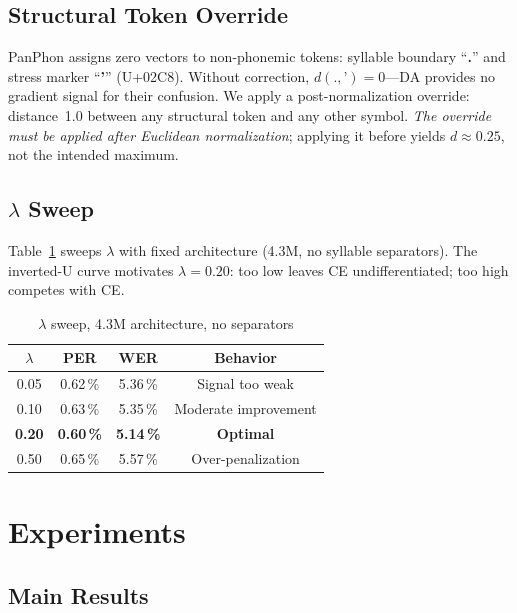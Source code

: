 \documentclass[conference]{IEEEtran}
\newcommand{\lam}{\lambda}                %
\begin{document}
\subsection{Structural Token Override}

PanPhon assigns zero vectors to non-phonemic tokens: syllable
boundary ``\textbf{.}'' and stress marker ``\textbf{'}'' (U+02C8).
Without correction, $d(., \text{'}) = 0$---DA provides no gradient
signal for their confusion.
We apply a post-normalization override: distance~1.0 between any
structural token and any other symbol.
\emph{The override must be applied after Euclidean normalization};
applying it before yields $d\!\approx\!0.25$, not the intended
maximum.

\subsection{$\lambda$ Sweep}

Table~\ref{tab:lambda} sweeps $\lam$ with fixed architecture (4.3M,
no syllable separators).
The inverted-U curve motivates $\lam\!=\!0.20$: too low leaves CE
undifferentiated; too high competes with CE.

\begin{table}[t]
  \caption{$\lambda$ sweep, 4.3M architecture, no separators}
  \label{tab:lambda}
  \centering\small
  \begin{tabular}{cccc}
    \toprule
    $\lambda$ & PER & WER & Behavior \\
    \midrule
    0.05 & 0.62\,\% & 5.36\,\% & Signal too weak \\
    0.10 & 0.63\,\% & 5.35\,\% & Moderate improvement \\
    \textbf{0.20} & \textbf{0.60\,\%} & \textbf{5.14\,\%} & \textbf{Optimal} \\
    0.50 & 0.65\,\% & 5.57\,\% & Over-penalization \\
    \bottomrule
  \end{tabular}
\end{table}

\section{Experiments}
\label{sec:results}

\subsection{Main Results}
\end{document}
